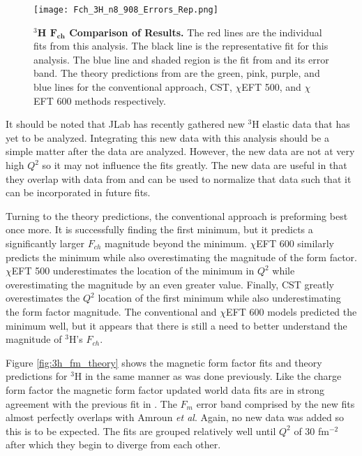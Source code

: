 \begin{figure}[!ht]
	\begin{center}
	\texttt{[image: Fch\_3H\_n8\_908\_Errors\_Rep.png]}
	\end{center}
	\caption[$^3$H $F_{ch}$ Comparison of Results]{
	{\bf{$^3$H $\boldsymbol{F_{ch}}$ Comparison of Results.}} The red lines are the individual fits from this analysis. The black line is the representative fit for this analysis. The blue line and shaded region is the fit from \cite{Article:Amroun} and its error band. The theory predictions from \cite{Article:Marcucci} are the green, pink, purple, and blue lines for the conventional approach, CST, $\chi$EFT 500, and $\chi$EFT 600 methods respectively.}
	\label{fig:3h_fch_theory}
\end{figure}

It should be noted that JLab has recently gathered new $^3$H elastic data that has yet to be analyzed. Integrating this new data with this analysis should be a simple matter after the data are analyzed. However, the new data are not at very high $Q^2$ so it may not influence the fits greatly. The new data are useful in that they overlap with data from \cite{Article:Beck82} and can be used to normalize that data such that it can be incorporated in future fits.

Turning to the theory predictions, the conventional approach is preforming best once more. It is successfully finding the first minimum, but it predicts a significantly larger $F_{ch}$ magnitude beyond the minimum. $\chi$EFT 600 similarly predicts the minimum while also overestimating the magnitude of the form factor. $\chi$EFT 500 underestimates the location of the minimum in $Q^2$ while overestimating the magnitude by an even greater value. Finally, CST greatly overestimates the $Q^2$ location of the first minimum while also underestimating the form factor magnitude. The conventional and $\chi$EFT 600 models predicted the minimum well, but it appears that there is still a need to better understand the magnitude of $^3$H's $F_{ch}$.

Figure \ref{fig:3h_fm_theory} shows the magnetic form factor fits and theory predictions for $^3$H in the same manner as was done previously. Like the charge form factor the magnetic form factor updated world data fits are in strong agreement with the previous fit in \cite{Article:Amroun}. The $F_m$ error band comprised by the new fits almost perfectly overlaps with Amroun \textit{et al}. Again, no new data was added so this is to be expected. The fits are grouped relatively well until $Q^2$ of 30 fm$^{-2}$ after which they begin to diverge from each other. 

